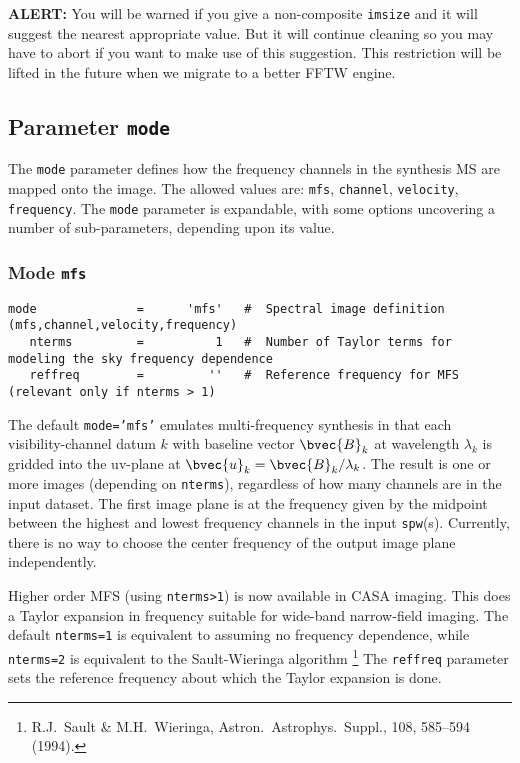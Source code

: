 {\bf ALERT:} You will be warned if you give a non-composite
{\tt imsize} and it will suggest the nearest appropriate value.
But it will continue cleaning so you may have to abort if you want
to make use of this suggestion.  This restriction will be lifted
in the future when we migrate to a better FFTW engine.

\subsection{Parameter {\tt mode} }
\label{section:im.pars.mode}

The {\tt mode} parameter defines how the frequency channels in the
synthesis MS are mapped onto the image.  The allowed values are:
{\tt mfs}, {\tt channel}, {\tt velocity}, {\tt frequency}.
The {\tt mode} parameter
is expandable, with some options uncovering a number of
sub-parameters, depending upon its value.

\subsubsection{Mode {\tt mfs} }
\label{section:im.pars.mode.mfs}

\begin{verbatim}
mode              =      'mfs'   #  Spectral image definition (mfs,channel,velocity,frequency)
   nterms         =          1   #  Number of Taylor terms for modeling the sky frequency dependence
   reffreq        =         ''   #  Reference frequency for MFS (relevant only if nterms > 1)
\end{verbatim}
\normalsize

The default {\tt mode='mfs'} emulates multi-frequency synthesis in
that each visibility-channel datum $k$ with baseline vector
$\bvec{B}_k$ at wavelength $\lambda_k$ is gridded into the uv-plane at
$\bvec{u}_k = \bvec{B}_k/\lambda_k$.  The result is one or more images
(depending on {\tt nterms}), regardless of how many channels are in the input dataset.
The first image plane is at the frequency given by the midpoint between
the highest and lowest frequency channels in the input {\tt spw}(s).
Currently, there is no way to choose the center frequency of the 
output image plane independently.

Higher order MFS (using {\tt nterms>1}) is now available in CASA
imaging.  This does a Taylor expansion in frequency suitable for
wide-band narrow-field imaging.  The default {\tt nterms=1} is
equivalent to assuming no frequency dependence, while {\tt nterms=2} 
is equivalent to the Sault-Wieringa algorithm 
\footnote{R.J.~Sault \& M.H.~Wieringa, Astron.\ Astrophys.\ Suppl., 108,
585--594 (1994).}
The {\tt reffreq} parameter sets the reference frequency about which the
Taylor expansion is done.

